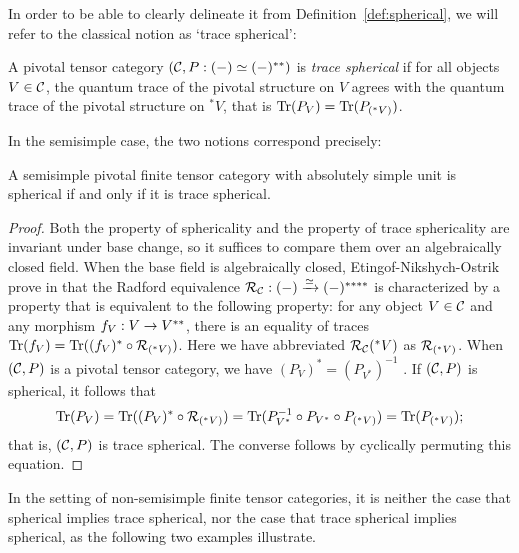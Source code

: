 \documentclass{amsart}
\begin{document}
In order to be able to clearly delineate it from Definition~\ref{def:spherical}, we will refer to the classical notion as `trace spherical':
\begin{definition} \label{def:trspherical}
A pivotal tensor category $(\mathcal C, P: (-) \simeq (-)^{**})$ is \emph{trace spherical} if for all objects $V \in \mathcal C$, the quantum trace of the pivotal structure on $V$ agrees with the quantum trace of the pivotal structure on ${}^* V$, that is $\mathrm{Tr}(P_V) = \mathrm{Tr}(P_{({}^* V)})$.
\end{definition} 
\nid In the semisimple case, the two notions correspond precisely:
\begin{proposition}
A semisimple pivotal finite tensor category with absolutely simple unit is spherical if and only if it is trace spherical.
\end{proposition} 
\begin{proof}
Both the property of sphericality and the property of trace sphericality are invariant under base change, so it suffices to compare them over an algebraically closed field.  When the base field is algebraically closed, Etingof-Nikshych-Ostrik prove in \cite[Thm 7.3 and Cor 7.4]{MR2097289} that the Radford equivalence $\mathcal R_\mathcal C : (-) \xrightarrow{\simeq} (-)^{****}$ is characterized by a property that is equivalent to the following property: for any object $V \in \mathcal C$ and any morphism $f_V: V \rightarrow V^{**}$, there is an equality of traces $\mathrm{Tr}(f_V) = \mathrm{Tr}((f_V)^* \circ \mathcal R_{({}^* V)})$.  Here we have abbreviated $\mathcal R_\mathcal C({}^* V)$ as $\mathcal R_{({}^* V)}$.  When $(\mathcal C,P)$ is a pivotal tensor category, we have $(P_V)^* = (P_{V^*})^{-1}$ 
\cite[Lemma 4.11; SR72, Prop 5.2.3]{0908.3347}. \nocite{rivano}%
If $(\mathcal C,P)$ is spherical, it follows that
\[
\Tr(P_V) = \Tr((P_V)^* \circ \cR_{({}^* V)}) %
= \Tr(P_{V^*}^{-1} \circ P_{V^*} \circ P_{({}^* V)}) = \Tr(P_{({}^* V)});
\]
that is, $(\mathcal C,P)$ is trace spherical.  The converse follows by cyclically permuting this equation.
\end{proof}

In the setting of non-semisimple finite tensor categories, it is neither the case that spherical implies trace spherical, nor the case that trace spherical implies spherical, as the following two examples illustrate.
\end{document}
